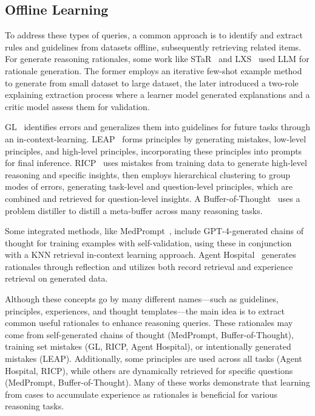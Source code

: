 \subsection{Offline Learning}
To address these types of queries, a common approach is to identify and extract rules and guidelines from datasets offline, subsequently retrieving related items. For generate reasoning rationales, some work like STaR~\cite{zelikman2022star} and LXS~\cite{stammer2023learning} used LLM for rationale generation. The former employs an iterative few-shot example method to generate from small dataset to large dataset, the later introduced a two-role explaining extraction process where a learner model generated explanations and a critic model assess them for validation. 

GL~\cite{pang2023guideline} identifies errors and generalizes them into guidelines for future tasks through an in-context-learning. LEAP~\cite{zhang2024context} forms principles by generating mistakes, low-level principles, and high-level principles, incorporating these principles into prompts for final inference. RICP~\cite{sun2024retrieved} uses mistakes from training data to generate high-level reasoning and specific insights, then employs hierarchical clustering to group modes of errors, generating task-level and question-level principles, which are combined and retrieved for question-level insights. A Buffer-of-Thought~\cite{yang2024buffer} uses a problem distiller to distill a meta-buffer across many reasoning tasks.

Some integrated methods, like MedPrompt~\cite{nori2023can}, include GPT-4-generated chains of thought for training examples with self-validation, using these in conjunction with a KNN retrieval in-context learning approach. Agent Hospital~\cite{li2024agent} generates rationales through reflection and utilizes both record retrieval and experience retrieval on generated data.

Although these concepts go by many different names—such as guidelines, principles, experiences, and thought templates—the main idea is to extract common useful rationales to enhance reasoning queries. These rationales may come from self-generated chains of thought (MedPrompt, Buffer-of-Thought), training set mistakes (GL, RICP, Agent Hospital), or intentionally generated mistakes (LEAP). Additionally, some principles are used across all tasks (Agent Hospital, RICP), while others are dynamically retrieved for specific questions (MedPrompt, Buffer-of-Thought). Many of these works demonstrate that learning from cases to accumulate experience as rationales is beneficial for various reasoning tasks.

